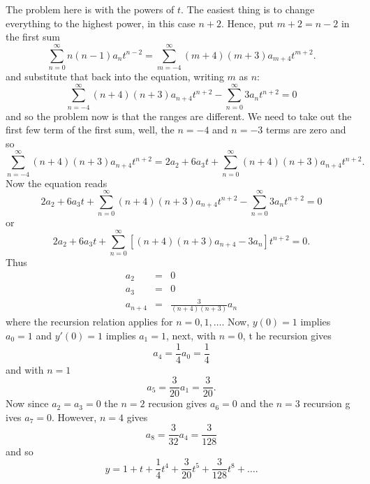\documentclass[12pt]{article}
\begin{document}
{\begin{enumerate}
\begin{equation}
\end{equation}
The problem here is with the powers of $t$. The easiest thing is 
to change everything to the highest power, in this case $n+2$. Hence, put $m+2=n
-2$ in the first sum
\begin{equation}
\sum_{n=0}^\infty{n(n-1)a_nt^{n-2}}=\sum_{m=-4}^\infty{(m+4)(m+3)a_{m+4}t^{m+2}}
.
\end{equation}
and substitute that back into the equation, writing $m$ as $n$:
\begin{equation}
\sum_{n=-4}^\infty{(n+4)(n+3)a_{n+4}t^{n+2}} -\sum_{n=0}^\infty{3a_nt^{n+2}}=0
\end{equation}
and so the problem now is that the ranges are different. We need to take out the
 first few term of the first sum, well, the $n=-4$ and $n=-3$ terms are zero and
 so 
\begin{equation}
\sum_{n=-4}^\infty{(n+4)(n+3)a_{n+4}t^{n+2}}=2a_2+6a_3t+\sum_{n=0}^\infty{(n+4)(
n+3)a_{n+4}t^{n+2}}.
\end{equation}
Now the equation reads
\begin{equation}
2a_2+6a_3t+\sum_{n=0}^\infty{(n+4)(n+3)a_{n+4}t^{n+2}} -\sum_{n=0}^\infty{3a_nt^
{n+2}}=0
\end{equation}
or
\begin{equation}
2a_2+6a_3t+\sum_{n=0}^\infty{\left[(n+4)(n+3)a_{n+4}-3a_n\right]t^{n+2}}=0.
\end{equation}
Thus 
\begin{eqnarray}
a_2&=&0\nonumber\\
a_3&=&0\nonumber\\
a_{n+4}&=&\frac{3}{(n+4)(n+3)}a_n
\end{eqnarray}
where the recursion relation applies for $n=0,1,\ldots$.
Now, $y(0)=1$ implies $a_0=1$ and $y'(0)=1$ implies $a_1=1$, next, with $n=0$, t
he recursion gives
\begin{equation}
a_4=\frac{1}{4}a_0=\frac{1}{4}
\end{equation}
and with $n=1$
\begin{equation}
a_5=\frac{3}{20}a_1=\frac{3}{20}.
\end{equation}
Now since $a_2=a_3=0$ the $n=2$ recusion gives $a_6=0$ and the $n=3$ recursion g
ives $a_7=0$. However, $n=4$ gives
\begin{equation}
a_8=\frac{3}{32}a_4=\frac{3}{128}
\end{equation}
and so 
\begin{equation}
y=1+t+\frac{1}{4}t^4+\frac{3}{20}t^5+\frac{3}{128}t^8+\ldots.
\end{equation}

\end{enumerate}}
\end{document}
